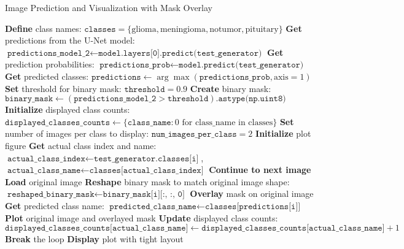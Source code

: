 \begin{algorithm}[H]
\caption{Image Prediction and Visualization with Mask Overlay}\label{alg:unet_visualization}
\begin{algorithmic}[1]
\State \textbf{Define} class names: $\texttt{classes} = \{\text{glioma}, \text{meningioma}, \text{notumor}, \text{pituitary}\}$
\State \textbf{Get} predictions from the U-Net model: $\texttt{predictions\_model\_2} \leftarrow \texttt{model.layers[0].predict(test\_generator)}$
\State \textbf{Get} prediction probabilities: $\texttt{predictions\_prob} \leftarrow \texttt{model.predict(test\_generator)}$
\State \textbf{Get} predicted classes: $\texttt{predictions} \leftarrow \arg\max(\texttt{predictions\_prob}, \text{axis}=1)$
\State \textbf{Set} threshold for binary mask: $\texttt{threshold} = 0.9$
\State \textbf{Create} binary mask: $\texttt{binary\_mask} \leftarrow (\texttt{predictions\_model\_2} > \texttt{threshold}).\texttt{astype(np.uint8)}$
\State \textbf{Initialize} displayed class counts: $\texttt{displayed\_classes\_counts} \leftarrow \{ \texttt{class\_name}: 0 \text{ for class\_name in classes} \}$
\State \textbf{Set} number of images per class to display: $\texttt{num\_images\_per\_class} = 2$
\State \textbf{Initialize} plot figure
    \State \textbf{Get} actual class index and name: $\texttt{actual\_class\_index} \leftarrow \texttt{test\_generator.classes[i]}$, $\texttt{actual\_class\_name} \leftarrow \texttt{classes[actual\_class\_index]}$
        \State \textbf{Continue to next image}
    \EndIf
    \State \textbf{Load} original image
    \State \textbf{Reshape} binary mask to match original image shape: $\texttt{reshaped\_binary\_mask} \leftarrow \texttt{binary\_mask[i][:, :, 0]}$
    \State \textbf{Overlay} mask on original image
    \State \textbf{Get} predicted class name: $\texttt{predicted\_class\_name} \leftarrow \texttt{classes[predictions[i]]}$
    \State \textbf{Plot} original image and overlayed mask
    \State \textbf{Update} displayed class counts: $\texttt{displayed\_classes\_counts[actual\_class\_name]} \leftarrow \texttt{displayed\_classes\_counts[actual\_class\_name]} + 1$
        \State \textbf{Break} the loop
    \EndIf
\EndFor
\State \textbf{Display} plot with tight layout
\end{algorithmic}
\end{algorithm}

